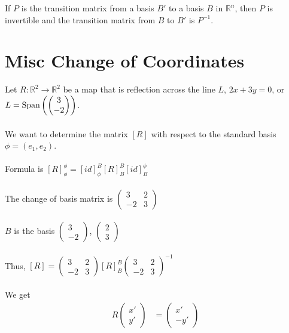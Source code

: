 \documentclass[letterpaper,12pt]{article}
\begin{document}
\begin{theorem}
If $P$ is the transition matrix from a basis $B'$ to a basis $B$ in $\mathbb{R}^n$, then $P$ is invertible and the transition matrix from $B$ to $B'$ is $P^{-1}$.
\end{theorem}



\section*{Misc Change of Coordinates}


\begin{example}
Let $R: \mathbb{R}^2 \rightarrow \mathbb{R}^2$ be a map that is reflection across the line $L$, $2x + 3y = 0$, or $L = \text{Span}\left(\begin{pmatrix} 3 \\ -2 \end{pmatrix} \right)$.
\\ \\ We want to determine the matrix $[R]$ with respect to the standard basis $\phi = (e_1, e_2)$.
\\ \\ Formula is $[R]_{\phi}^{\phi} = [id]_{\phi}^B [R]_{B}^B [id]_B^{\phi}$
\\ \\ The change of basis matrix is $\begin{pmatrix} 3 & 2 \\ -2 & 3 \end{pmatrix}$
\\ \\ $B$ is the basis $\begin{pmatrix} 3 \\ -2 \end{pmatrix}$, $\begin{pmatrix} 2 \\ 3 \end{pmatrix}$
\\ \\ Thus, $[R] = \begin{pmatrix} 3 & 2 \\ -2 & 3 \end{pmatrix} [R]_B^B \begin{pmatrix} 3 & 2 \\ -2 & 3 \end{pmatrix}^{-1}$
\\ \\ We get
\begin{align*}
    R\begin{pmatrix} x' \\ y' \end{pmatrix} & = \begin{pmatrix} x' \\ -y' \end{pmatrix} \\

\end{align*}
\end{example}
\end{document}

